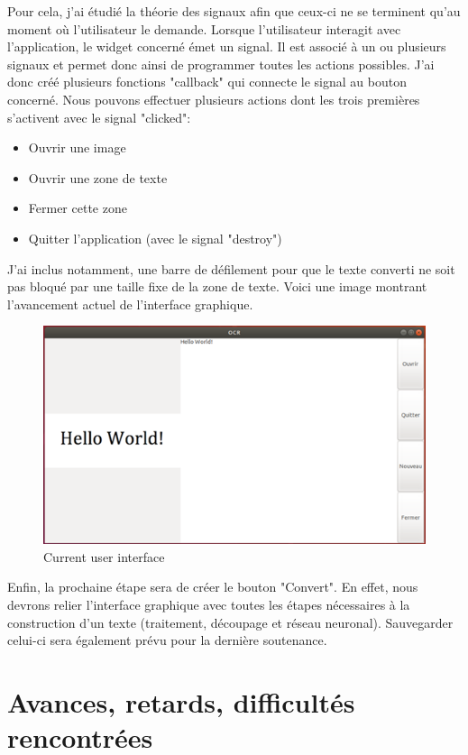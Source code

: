\documentclass[12pt]{report}
\begin{document}
Pour cela, j’ai étudié la théorie des signaux afin que ceux-ci ne se terminent qu’au moment où l’utilisateur le demande. Lorsque l’utilisateur interagit avec l’application, le widget concerné émet un signal. Il est associé à un ou plusieurs signaux et permet donc ainsi de programmer toutes les actions possibles. J’ai donc créé plusieurs fonctions "callback" qui connecte le signal au bouton concerné. 
Nous pouvons effectuer plusieurs actions dont les trois premières s’activent avec le signal "clicked":

\begin{itemize}[label=\textbullet]
	\item Ouvrir une image
	\item Ouvrir une zone de texte
	\item Fermer cette zone
	\item Quitter l'application (avec le signal "destroy")
\end{itemize}

J’ai inclus notamment, une barre de défilement pour que le texte converti ne soit pas bloqué par une taille fixe de la zone de texte.
Voici une image montrant l’avancement actuel de l’interface graphique.

\begin{figure}[H]
    \centering
    \includegraphics[width=1\textwidth]{UI}
    \caption{Current user interface}
\end{figure}

Enfin, la prochaine étape sera de créer le bouton "Convert". En effet, nous devrons relier l’interface graphique avec toutes les étapes nécessaires à la construction d’un texte (traitement, découpage et réseau neuronal). Sauvegarder celui-ci sera également prévu pour la dernière soutenance.

\chapter{Avances, retards, difficultés rencontrées}
\end{document}
